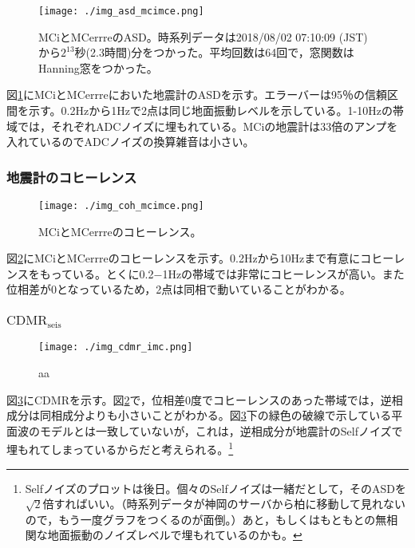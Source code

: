 \begin{figure}[H]
  \begin{center}
    \texttt{[image: ./img\_asd\_mcimce.png]}
  \end{center}
  \caption{MCiとMCerrreのASD。時系列データは2018/08/02 07:10:09 (JST)から$2^{13}$秒(2.3時間)分をつかった。平均回数は64回で，窓関数はHanning窓をつかった。}\label{img:img_asd_imc}
\end{figure}

図\ref{img:img_asd_imc}にMCiとMCerrreにおいた地震計のASDを示す。エラーバーは95％の信頼区間を示す。0.2Hzから1Hzで2点は同じ地面振動レベルを示している。1-10Hzの帯域では，それぞれADCノイズに埋もれている。MCiの地震計は33倍のアンプを入れているのでADCノイズの換算雑音は小さい。


\subsubsection{地震計のコヒーレンス}

\begin{figure}[H]
  \begin{center}
    \texttt{[image: ./img\_coh\_mcimce.png]}
  \end{center}
  \caption{MCiとMCerrreのコヒーレンス。}\label{img:img_coherence_imc}
\end{figure}

図\ref{img:img_coherence_imc}にMCiとMCerrreのコヒーレンスを示す。0.2Hzから10Hzまで有意にコヒーレンスをもっている。とくに0.2−1Hzの帯域では非常にコヒーレンスが高い。また位相差が0となっているため，2点は同相で動いていることがわかる。



\subsubsection{$\mathrm{CDMR_{seis}}$}
\begin{figure}[H]
  \begin{center}
    \texttt{[image: ./img\_cdmr\_imc.png]}
  \end{center}
  \caption{aa}\label{img:img_cdmr_imc}
\end{figure}
図\ref{img:img_cdmr_imc}にCDMRを示す。図\ref{img:img_coherence_imc}で，位相差0度でコヒーレンスのあった帯域では，逆相成分は同相成分よりも小さいことがわかる。図\ref{img:img_cdmr_imc}下の緑色の破線で示している平面波のモデルとは一致していないが，これは，逆相成分が地震計のSelfノイズで埋もれてしまっているからだと考えられる。\footnote[12]{Selfノイズのプロットは後日。個々のSelfノイズは一緒だとして，そのASDを$\sqrt{2}$倍すればいい。（時系列データが神岡のサーバから柏に移動して見れないので，もう一度グラフをつくるのが面倒。）あと，もしくはもともとの無相関な地面振動のノイズレベルで埋もれているのかも。}






